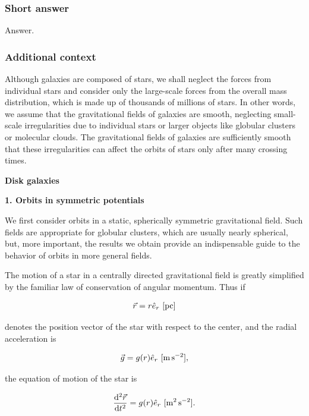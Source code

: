 \documentclass[a4paper,10pt]{article}
\begin{document}
\subsubsection{Short answer}

Answer.

\subsubsection{Additional context}

Although galaxies are composed of stars, we shall neglect the forces from individual stars and consider only the large-scale forces from the overall mass distribution, which is made up of thousands of millions of stars. In other words, we assume that the gravitational fields of galaxies are smooth, neglecting small-scale irregularities due to individual stars or larger objects like globular clusters or molecular clouds. The gravitational fields of galaxies are sufficiently smooth that these irregularities can affect the orbits of stars only after many crossing times.

{\noindent}\textbf{Disk galaxies}

{\noindent}\textbf{1. Orbits in symmetric potentials} 

{\noindent}We first consider orbits in a static, spherically symmetric gravitational field. Such fields are appropriate for globular clusters, which are usually nearly spherical, but, more important, the results we obtain provide an indispensable guide to the behavior of orbits in more general fields.

{\noindent}The motion of a star in a centrally directed gravitational field is greatly simplified by the familiar law of conservation of angular momentum. Thus if

\begin{align*}
    \vec{r} = r\hat{e}_r ~ [{\rm pc}]
\end{align*}

{\noindent}denotes the position vector of the star with respect to the center, and the radial acceleration is

\begin{align*}
    \vec{g} = g(r)\hat{e}_r ~ [{\rm m\,s^{-2}}],
\end{align*}

{\noindent}the equation of motion of the star is

\begin{align*}
    \frac{{\rm d}^2\vec{r}}{{\rm d}t^2} = g(r)\hat{e}_r ~ [{\rm m^2\,s^{-2}}].
\end{align*}
\end{document}
